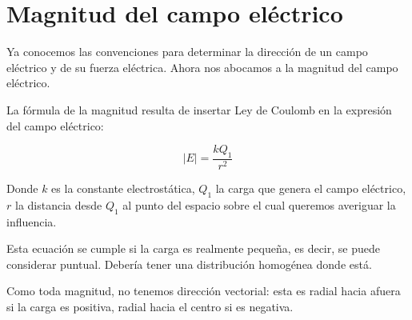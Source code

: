 \section{Magnitud del campo eléctrico}

Ya conocemos las convenciones para determinar la dirección 
de un campo eléctrico y de su fuerza eléctrica.
Ahora nos abocamos a la magnitud del campo eléctrico.

La fórmula de la magnitud resulta de insertar Ley de Coulomb 
en la expresión del campo eléctrico:

\vspace{.3cm}
\begin{equation}
    |E| = \frac{kQ_1}{r^{2}}
\end{equation}
\vspace{.3cm}

Donde \(k\) es la constante electrostática,
\(Q_1\) la carga que genera el campo eléctrico,
\(r\) la distancia desde \(Q_1\) al punto
del espacio sobre el cual queremos averiguar la influencia.

Esta ecuación se cumple si la carga es realmente pequeña,
es decir,
se puede considerar puntual.
Debería tener una distribución homogénea donde está.

Como toda magnitud, no tenemos dirección vectorial:
esta es radial hacia afuera si la carga es positiva,
radial hacia el centro si es negativa.